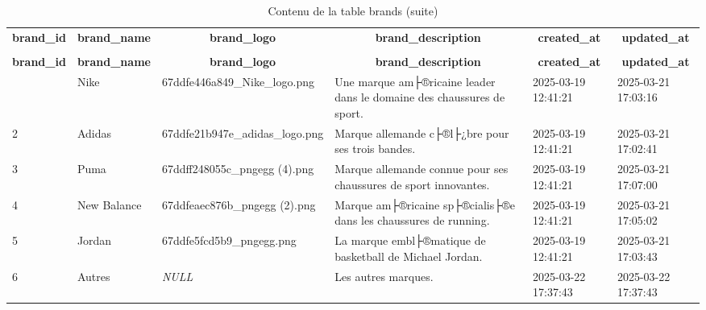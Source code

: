 %
%
 \begin{longtable}{|l|l|l|l|l|l|} 
 \hline \endhead \hline \endfoot \hline 
 \caption{Contenu de la table brands} \label{tab:brands-data} \\\hline \multicolumn{1}{|c|}{\textbf{brand\_id}} & \multicolumn{1}{|c|}{\textbf{brand\_name}} & \multicolumn{1}{|c|}{\textbf{brand\_logo}} & \multicolumn{1}{|c|}{\textbf{brand\_description}} & \multicolumn{1}{|c|}{\textbf{created\_at}} & \multicolumn{1}{|c|}{\textbf{updated\_at}} \\ \hline \hline  \endfirsthead 
\caption{Contenu de la table brands (suite)} \\ \hline \multicolumn{1}{|c|}{\textbf{brand\_id}} & \multicolumn{1}{|c|}{\textbf{brand\_name}} & \multicolumn{1}{|c|}{\textbf{brand\_logo}} & \multicolumn{1}{|c|}{\textbf{brand\_description}} & \multicolumn{1}{|c|}{\textbf{created\_at}} & \multicolumn{1}{|c|}{\textbf{updated\_at}} \\ \hline \hline \endhead \endfoot
1 & Nike & 67ddfe446a849\_Nike\_logo.png & Une marque am├®ricaine leader dans le domaine des chaussures de sport. & 2025-03-19 12:41:21 & 2025-03-21 17:03:16 \\ \hline 
2 & Adidas & 67ddfe21b947e\_adidas\_logo.png & Marque allemande c├®l├¿bre pour ses trois bandes. & 2025-03-19 12:41:21 & 2025-03-21 17:02:41 \\ \hline 
3 & Puma & 67ddff248055c\_pngegg (4).png & Marque allemande connue pour ses chaussures de sport innovantes. & 2025-03-19 12:41:21 & 2025-03-21 17:07:00 \\ \hline 
4 & New Balance & 67ddfeaec876b\_pngegg (2).png & Marque am├®ricaine sp├®cialis├®e dans les chaussures de running. & 2025-03-19 12:41:21 & 2025-03-21 17:05:02 \\ \hline 
5 & Jordan & 67ddfe5fcd5b9\_pngegg.png & La marque embl├®matique de basketball de Michael Jordan. & 2025-03-19 12:41:21 & 2025-03-21 17:03:43 \\ \hline 
6 & Autres & \textit{NULL} & Les autres marques. & 2025-03-22 17:37:43 & 2025-03-22 17:37:43 \\ \hline 
 \end{longtable}

